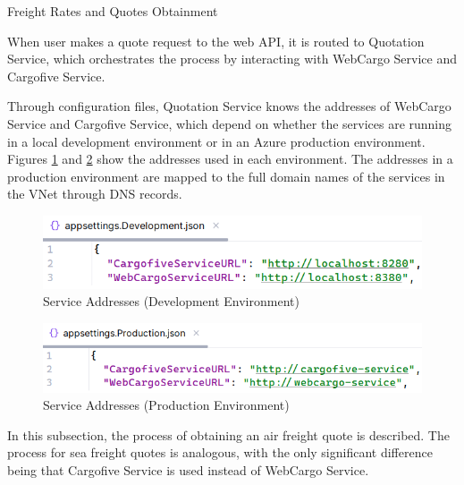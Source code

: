 \documentclass[12pt, reqno]{amsbook}
\makeatletter
\def\subsection{\@startsection{subsection}{2}%
      \z@{.5\linespacing\@plus.7\linespacing}{.25\linespacing}%
      {\normalfont\bfseries\flushleft}}
\theoremstyle{definition}
\theoremstyle{definition}
\numberwithin{section}{chapter}
\numberwithin{table}{chapter}
\numberwithin{figure}{chapter}
\makeatother
\begin{document}
\subsection{Freight Rates and Quotes Obtainment}
\label{Subsection:Freight_Rates_And_Quotes_Obtainment}

When user makes a quote request to the web \ac{API}, it is routed to Quotation Service, which orchestrates the process by interacting with WebCargo Service and Cargofive Service.

Through configuration files, Quotation Service knows the addresses of WebCargo Service and Cargofive Service, which depend on whether the services are running in a local development environment or in an Azure production environment. Figures \ref{Figure:ServiceAddressesDevelopment} and \ref{Figure:ServiceAddressesProduction} show the addresses used in each environment. The addresses in a production environment are mapped to the full domain names of the services in the \ac{VNet} through \ac{DNS} records.

\begin{figure}[H]
  \centering
  \includegraphics[width=0.8\linewidth]{images/ServiceAddressesDevelopment.png}
  \caption{\label{Figure:ServiceAddressesDevelopment}Service Addresses (Development Environment)}
\end{figure}

\begin{figure}[H]
  \centering
  \includegraphics[width=0.8\linewidth]{images/ServiceAddressesProduction.png}
  \caption{\label{Figure:ServiceAddressesProduction}Service Addresses (Production Environment)}
\end{figure}

In this subsection, the process of obtaining an air freight quote is described. The process for sea freight quotes is analogous, with the only significant difference being that Cargofive Service is used instead of WebCargo Service.
\end{document}

